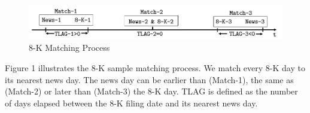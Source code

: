 \begin{figure}
	\caption{8-K Matching Process} \label{fig1}
	\begin{center}
		\includegraphics[scale=0.7]{../output/fig/fig1_matching.png}
	\end{center}
\end{figure}

Figure 1 illustrates the 8-K sample matching process. We match every 8-K day to its nearest news day. The news day can be earlier than (Match-1), the same as (Match-2) or later than (Match-3) the 8-K day. TLAG is defined as the number of days elapsed between the 8-K filing date and its nearest news day.

%
